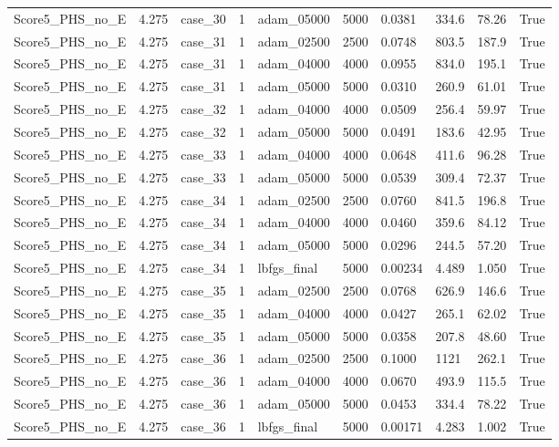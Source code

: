 \begin{longtable}{llllllllll}
Score5\_PHS\_no\_E & 4.275 & case\_30 & 1 & adam\_05000 & 5000 & 0.0381 & 334.6 & 78.26 & True \\
Score5\_PHS\_no\_E & 4.275 & case\_31 & 1 & adam\_02500 & 2500 & 0.0748 & 803.5 & 187.9 & True \\
Score5\_PHS\_no\_E & 4.275 & case\_31 & 1 & adam\_04000 & 4000 & 0.0955 & 834.0 & 195.1 & True \\
Score5\_PHS\_no\_E & 4.275 & case\_31 & 1 & adam\_05000 & 5000 & 0.0310 & 260.9 & 61.01 & True \\
Score5\_PHS\_no\_E & 4.275 & case\_32 & 1 & adam\_04000 & 4000 & 0.0509 & 256.4 & 59.97 & True \\
Score5\_PHS\_no\_E & 4.275 & case\_32 & 1 & adam\_05000 & 5000 & 0.0491 & 183.6 & 42.95 & True \\
Score5\_PHS\_no\_E & 4.275 & case\_33 & 1 & adam\_04000 & 4000 & 0.0648 & 411.6 & 96.28 & True \\
Score5\_PHS\_no\_E & 4.275 & case\_33 & 1 & adam\_05000 & 5000 & 0.0539 & 309.4 & 72.37 & True \\
Score5\_PHS\_no\_E & 4.275 & case\_34 & 1 & adam\_02500 & 2500 & 0.0760 & 841.5 & 196.8 & True \\
Score5\_PHS\_no\_E & 4.275 & case\_34 & 1 & adam\_04000 & 4000 & 0.0460 & 359.6 & 84.12 & True \\
Score5\_PHS\_no\_E & 4.275 & case\_34 & 1 & adam\_05000 & 5000 & 0.0296 & 244.5 & 57.20 & True \\
Score5\_PHS\_no\_E & 4.275 & case\_34 & 1 & lbfgs\_final & 5000 & 0.00234 & 4.489 & 1.050 & True \\
Score5\_PHS\_no\_E & 4.275 & case\_35 & 1 & adam\_02500 & 2500 & 0.0768 & 626.9 & 146.6 & True \\
Score5\_PHS\_no\_E & 4.275 & case\_35 & 1 & adam\_04000 & 4000 & 0.0427 & 265.1 & 62.02 & True \\
Score5\_PHS\_no\_E & 4.275 & case\_35 & 1 & adam\_05000 & 5000 & 0.0358 & 207.8 & 48.60 & True \\
Score5\_PHS\_no\_E & 4.275 & case\_36 & 1 & adam\_02500 & 2500 & 0.1000 & 1121 & 262.1 & True \\
Score5\_PHS\_no\_E & 4.275 & case\_36 & 1 & adam\_04000 & 4000 & 0.0670 & 493.9 & 115.5 & True \\
Score5\_PHS\_no\_E & 4.275 & case\_36 & 1 & adam\_05000 & 5000 & 0.0453 & 334.4 & 78.22 & True \\
Score5\_PHS\_no\_E & 4.275 & case\_36 & 1 & lbfgs\_final & 5000 & 0.00171 & 4.283 & 1.002 & True \\

\end{longtable}
